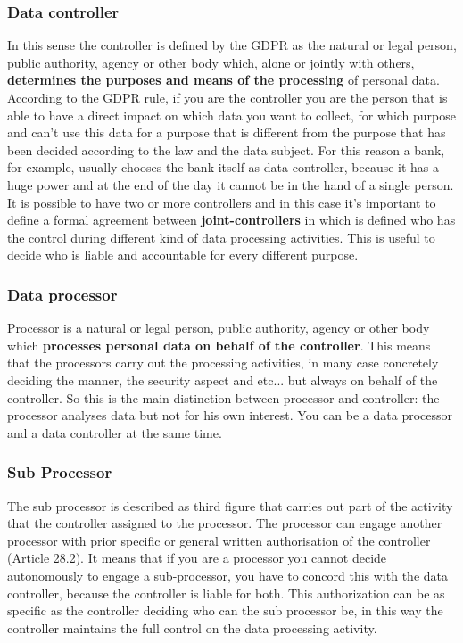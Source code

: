 \subsubsection{Data controller} 
In this sense the controller is defined by the GDPR as the natural or legal person, public authority, agency or other body which, alone or jointly with others, \textbf{determines the purposes and means of the processing} of personal data. According to the GDPR rule, if you are the controller you are the person that is able to have a direct impact on which data you want to collect, for which purpose and can't use this data for a purpose that is different from the purpose that has been decided according to the law and the data subject. For this reason a bank, for example, usually chooses the bank itself as data controller, because it has a huge power and at the end of the day it cannot be in the hand of a single person. It is possible to have two or more controllers and in this case it’s important to define a formal agreement between \textbf{joint-controllers} in which is defined who has the control during different kind of data processing activities. This is useful to decide who is liable and accountable for every different purpose.
\subsubsection{Data processor}
Processor is a natural or legal person, public authority, agency or other body which \textbf{processes personal data on behalf of the controller}. This means that the processors carry out the processing activities, in many case concretely deciding the manner, the security aspect and etc... but always on behalf of the controller. So this is the main distinction between processor and controller: the processor analyses data but not for his own interest. You can be a data processor and a data controller at the same time.
\subsubsection{Sub Processor}
The sub processor is described as third figure that carries out part of the activity that the controller assigned to the processor. The processor can engage another processor with prior specific or general written authorisation of the controller (Article 28.2). It means that if you are a processor you cannot decide autonomously to engage a sub-processor, you have to concord this with the data controller, because the controller is liable for both. This authorization can be as specific as the controller deciding who can the sub processor be, in this way the controller maintains the full control on the data processing activity.
